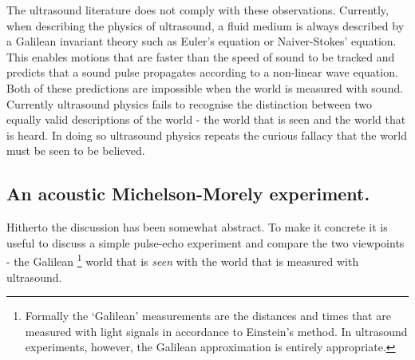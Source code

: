 \documentclass[10pt, fleqn,final,showtrims,oldfontcommands, article,a4paper,oneside]{memoir} %
\newcommand{\secref}[1]{section~\ref{sec:#1}}
\begin{document}
The ultrasound literature does not comply with these observations.
Currently, when describing the physics of ultrasound, a fluid medium is always described by a Galilean invariant theory such as Euler's equation or Naiver-Stokes' equation.
This enables motions that are faster than the speed of sound to be tracked 
and predicts that  a sound pulse  propagates according to  a non-linear wave equation.
Both of these predictions are impossible when the world is measured with sound.
%
Currently ultrasound physics fails to recognise the distinction between  two equally valid descriptions of the world -
the world that is seen
and the world that is heard.
In doing so ultrasound physics repeats the curious  fallacy that  the world must be seen to be believed.

\subsection{An acoustic Michelson-Morely  experiment.}

Hitherto the discussion has been somewhat abstract.
To make it concrete it is useful to discuss a simple pulse-echo experiment and  compare the two viewpoints
- the Galilean%
\footnote{Formally the `Galilean' measurements are the distances and times that are  measured with light signals in accordance to Einstein's method.
In ultrasound experiments, however, the Galilean approximation is entirely appropriate.}
 world that is {\em seen} 
with the world that is measured with ultrasound. %
%

\end{document}
